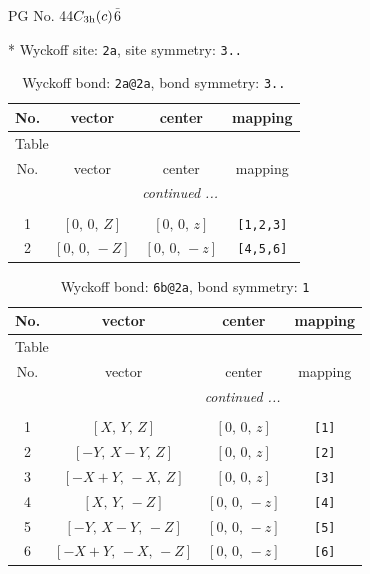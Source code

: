 \documentclass[fleqn,8pt]{jsarticle}
\begin{document}
\setcounter{MaxMatrixCols}{32}

\renewcommand{\tablename}{Table~}
\renewcommand{\figurename}{Figure~}
\begin{center}
\LARGE
PG No. 44\quad$C_{\rm 3h}(c)$\quad$\bar{6}$\quad[ hexagonal ]
\end{center}


* Wyckoff site: {\tt 2a}, site symmetry: {\tt 3..}
\renewcommand{\arraystretch}{1.2}
\begin{longtable}{cccc}
\caption{Wyckoff bond: {\tt 2a@2a}, bond symmetry: {\tt 3..}}
 \\
 \hline \hline
No. & vector & center & mapping \\ \hline \endfirsthead

\multicolumn{3}{l}{\tablename\ \thetable{}} \\
 \hline \hline
No. & vector & center & mapping \\ \hline \endhead

 \hline \hline
\multicolumn{3}{r}{\footnotesize\it continued ...} \\ \endfoot

 \hline \hline
\multicolumn{3}{r}{} \\ \endlastfoot

1 & $\left[ 0,\, 0,\, Z \right]$ & $\left[ 0,\, 0,\, z \right]$ & {\tt [1,2,3]} \\ \hline
2 & $\left[ 0,\, 0,\, - Z \right]$ & $\left[ 0,\, 0,\, - z \right]$ & {\tt [4,5,6]} \\
\end{longtable}
\renewcommand{\arraystretch}{1.2}
\begin{longtable}{cccc}
\caption{Wyckoff bond: {\tt 6b@2a}, bond symmetry: {\tt 1}}
 \\
 \hline \hline
No. & vector & center & mapping \\ \hline \endfirsthead

\multicolumn{3}{l}{\tablename\ \thetable{}} \\
 \hline \hline
No. & vector & center & mapping \\ \hline \endhead

 \hline \hline
\multicolumn{3}{r}{\footnotesize\it continued ...} \\ \endfoot

 \hline \hline
\multicolumn{3}{r}{} \\ \endlastfoot

1 & $\left[ X,\, Y,\, Z \right]$ & $\left[ 0,\, 0,\, z \right]$ & {\tt [1]} \\ \hline
2 & $\left[ - Y,\, X - Y,\, Z \right]$ & $\left[ 0,\, 0,\, z \right]$ & {\tt [2]} \\ \hline
3 & $\left[ - X + Y,\, - X,\, Z \right]$ & $\left[ 0,\, 0,\, z \right]$ & {\tt [3]} \\ \hline
4 & $\left[ X,\, Y,\, - Z \right]$ & $\left[ 0,\, 0,\, - z \right]$ & {\tt [4]} \\ \hline
5 & $\left[ - Y,\, X - Y,\, - Z \right]$ & $\left[ 0,\, 0,\, - z \right]$ & {\tt [5]} \\ \hline
6 & $\left[ - X + Y,\, - X,\, - Z \right]$ & $\left[ 0,\, 0,\, - z \right]$ & {\tt [6]} \\
\end{longtable}
\end{document}
